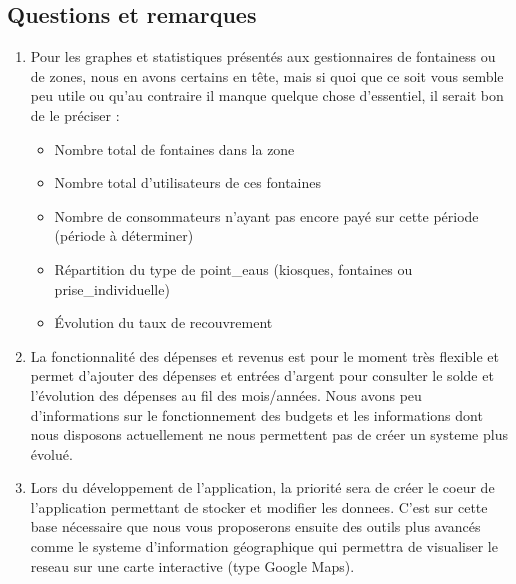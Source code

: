 \documentclass[a4paper, 11pt]{article}
\begin{document}
\begin{mdframed}[style=HighlightQuestion]
    \subsection{Questions et remarques}
    \begin{enumerate}
      \item Pour les graphes et statistiques présentés aux gestionnaires de \glspl{fontaines} ou de \gls{zones}, nous en avons certains en tête, mais si quoi que ce soit vous semble peu utile ou qu'au contraire il manque quelque chose d'essentiel, il serait bon de le préciser :
      \begin{itemize}
        \item Nombre total de \glspl{fontaine} dans la \gls{zone}
        \item Nombre total d'\glspl{utilisateur} de ces \glspl{fontaine}
        \item Nombre de \glspl{consommateur} n'ayant pas encore payé sur cette période (période à déterminer)
        \item Répartition du type de \glspl{point_eau} (kiosques, \glspl{fontaine} ou \gls{prise_individuelle})
        \item Évolution du taux de recouvrement
      \end{itemize}
      \item La fonctionnalité des dépenses et revenus est pour le moment très flexible et permet d'ajouter des dépenses et entrées d'argent pour consulter le solde et l'évolution des dépenses au fil des mois/années. Nous avons peu d'informations sur le fonctionnement des budgets et les informations dont nous disposons actuellement ne nous permettent pas de créer un \gls{systeme} plus évolué.
      \item Lors du développement de l'\gls{application}, la priorité sera de créer le coeur de l'\gls{application} permettant de stocker et modifier les \glspl{donnee}. C'est sur cette base nécessaire que nous vous proposerons ensuite des outils plus avancés comme le \gls{systeme} d'information géographique qui permettra de visualiser le \gls{reseau} sur une carte interactive (type Google Maps).

\end{enumerate}
\end{mdframed}
\end{document}
